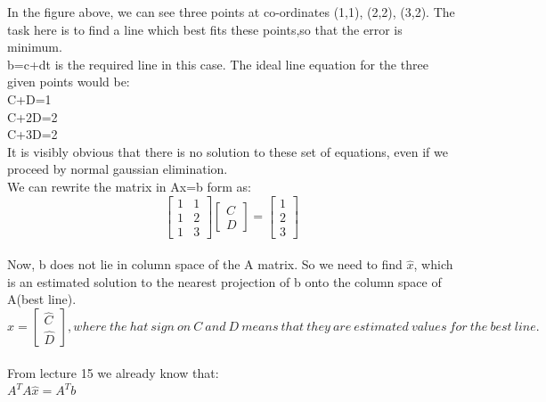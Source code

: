 \documentclass[]{article}
\begin{document}
\noindent
In the figure above, we can see three points at co-ordinates (1,1), (2,2), (3,2). The task here is to find a line which best fits these points,so that the error is minimum.\\

\noindent
b=c+dt is the required line in this case. The ideal line equation for the three given points would be:\\

\noindent
C+D=1\\
C+2D=2\\
C+3D=2\\

\noindent
It is visibly obvious that there is no solution to these set of equations, even if we proceed by normal gaussian elimination.\\

\noindent
We can rewrite the matrix in Ax=b form as:\\

\noindent
\[
\begin{bmatrix}
	1 & 1\\
	1& 2\\

	1&3
	
\end{bmatrix}\begin{bmatrix}
C\\
D
\end{bmatrix}=\begin{bmatrix}
1\\
2\\
3
\end{bmatrix}
\]\\

\noindent
Now, b does not lie in column space of the A matrix. So we need to find $\hat{x}$, which is an estimated solution to the nearest projection of b onto the column space of A(best line).\\

\[
\hat{x}= \begin{bmatrix}
	\hat{C}\\
	\hat{D}
\end{bmatrix},
where \ the \ hat \ sign \ on \ C \ and \ D  \ means \ that \ they \ are \ estimated \ values \ for \ the \ best \ line.
\]\\

\noindent
From lecture 15 we already know that:\\

\noindent
$A^TA\hat{x}=A^Tb$\\
\end{document}
